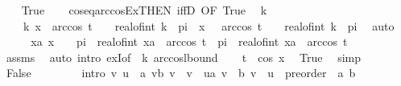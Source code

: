\begin{isabellebody}
\ \ \isamarkupfalse%
\ True\isanewline
\ \ \isamarkupfalse%
\ cos{\isacharunderscore}{\kern0pt}eq{\isacharunderscore}{\kern0pt}arccos{\isacharunderscore}{\kern0pt}Ex{\isacharbrackleft}{\kern0pt}THEN\ iffD{}{\isacharcomma}{\kern0pt}\ OF\ True{\isacharbrackright}{\kern0pt}\ \isamarkupfalse%
\ k\ \isanewline
\ \ \ \ k{\isacharcolon}{\kern0pt}\ {\isachardoublequoteopen}x\ {\isacharequal}{\kern0pt}\ arccos\ t\ {\isacharplus}{\kern0pt}\ {}\ {\isacharasterisk}{\kern0pt}\ real{\isacharunderscore}{\kern0pt}of{\isacharunderscore}{\kern0pt}int\ k\ {\isacharasterisk}{\kern0pt}\ pi\ {\isasymor}\ x\ {\isacharequal}{\kern0pt}\ {\isacharminus}{\kern0pt}\ arccos\ t\ {\isacharplus}{\kern0pt}\ {}\ {\isacharasterisk}{\kern0pt}\ real{\isacharunderscore}{\kern0pt}of{\isacharunderscore}{\kern0pt}int\ k\ {\isacharasterisk}{\kern0pt}\ pi{\isachardoublequoteclose}\ \isamarkupfalse%
\ auto\isanewline
\ \ \isamarkupfalse%
\ \isamarkupfalse%
\ {\isachardoublequoteopen}{\isasymexists}xa{\isachardot}{\kern0pt}\ x\ {\isasymin}\ {\isacharbraceleft}{\kern0pt}{}\ {\isacharasterisk}{\kern0pt}\ pi\ {\isacharasterisk}{\kern0pt}\ real{\isacharunderscore}{\kern0pt}of{\isacharunderscore}{\kern0pt}int\ xa\ {\isacharminus}{\kern0pt}\ arccos\ t{\isachardot}{\kern0pt}{\isachardot}{\kern0pt}{}\ {\isacharasterisk}{\kern0pt}\ pi\ {\isacharasterisk}{\kern0pt}\ real{\isacharunderscore}{\kern0pt}of{\isacharunderscore}{\kern0pt}int\ xa\ {\isacharplus}{\kern0pt}\ arccos\ t{\isacharbraceright}{\kern0pt}{\isachardoublequoteclose}\isanewline
\ \ \ \ \isamarkupfalse%
\ assms\ \isamarkupfalse%
\ {\isacharparenleft}{\kern0pt}auto\ intro{\isacharbang}{\kern0pt}{\isacharcolon}{\kern0pt}\ exI{\isacharbrackleft}{\kern0pt}of\ {\isacharunderscore}{\kern0pt}\ k{\isacharbrackright}{\kern0pt}\ arccos{\isacharunderscore}{\kern0pt}lbound{\isacharparenright}{\kern0pt}\isanewline
\ \ \isamarkupfalse%
\ {\isachardoublequoteopen}t\ {\isasymle}\ cos\ x{\isachardoublequoteclose}\ \isamarkupfalse%
\ True\ \isamarkupfalse%
\ simp\isanewline
{}\isamarkupfalse%
\isanewline
\ \ \isamarkupfalse%
\ False\isanewline
\ \ \isakeywordONE{{\isacharbraceleft}{\kern0pt}}\isamarkupfalse%
\isanewline
\ \ \ \ \isamarkupfalse%
\ {\isacharbrackleft}{\kern0pt}intro{\isacharbrackright}{\kern0pt}{\isacharcolon}{\kern0pt}\ {\isachardoublequoteopen}{\isasymexists}v{\isachardot}{\kern0pt}\ u\ {\isasymin}\ {\isacharbraceleft}{\kern0pt}a\ v{\isacharless}{\kern0pt}{\isachardot}{\kern0pt}{\isachardot}{\kern0pt}{\isacharless}{\kern0pt}b\ v{\isacharbraceright}{\kern0pt}\ {\isasymLongrightarrow}\ {\isasymexists}v\ {\isachardot}{\kern0pt}\ u{\isasymin}{\isacharbraceleft}{\kern0pt}a\ v\ {\isachardot}{\kern0pt}{\isachardot}{\kern0pt}\ b\ v{\isacharbraceright}{\kern0pt}{\isachardoublequoteclose}\ \ u\ {\isacharcolon}{\kern0pt}{\isacharcolon}{\kern0pt}\ {\isachardoublequoteopen}{\isacharunderscore}{\kern0pt}{\isacharcolon}{\kern0pt}{\isacharcolon}{\kern0pt}preorder{\isachardoublequoteclose}\ \ a\ b\isanewline

\end{isabellebody}
